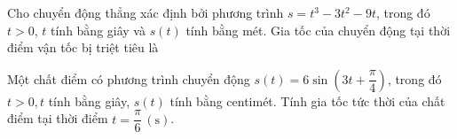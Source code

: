 \begin{baitap}
	Cho chuyển động thẳng xác định bởi phương trình $s=t^3-3t^2-9t$, trong đó $t>0$, $t$ tính bằng giây và $s(t)$ tính bằng mét. Gia tốc của chuyển động tại thời điểm vận tốc bị triệt tiêu là
\end{baitap}

\begin{baitap}%
	Một chất điểm có phương trình chuyển động $s(t)=6 \sin \left(3 t+\dfrac{\pi}{4}\right)$, trong đó $t>0, t$ tính bằng giây, $s(t)$ tính bằng centimét. Tính gia tốc tức thời của chất điểm tại thời điểm $t=\dfrac{\pi}{6}\,(\mathrm{s})$.
\end{baitap}
